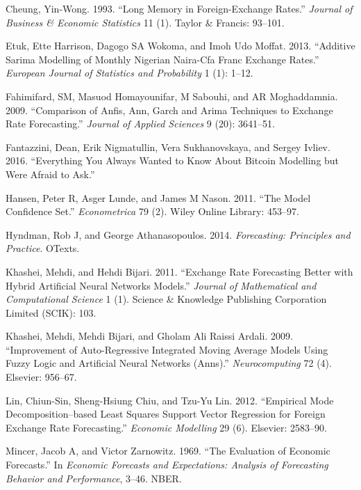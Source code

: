 \documentclass[12pt,a4paper]{article}
\numberwithin{equation}{section}
\numberwithin{figure}{section}
\numberwithin{table}{section}
\begin{document}
\hypertarget{ref-cheung1993}{}
Cheung, Yin-Wong. 1993. ``Long Memory in Foreign-Exchange Rates.''
\emph{Journal of Business \& Economic Statistics} 11 (1). Taylor \&
Francis: 93--101.

\hypertarget{ref-etuk2013}{}
Etuk, Ette Harrison, Dagogo SA Wokoma, and Imoh Udo Moffat. 2013.
``Additive Sarima Modelling of Monthly Nigerian Naira-Cfa Franc Exchange
Rates.'' \emph{European Journal of Statistics and Probability} 1 (1):
1--12.

\hypertarget{ref-fahimifard2009}{}
Fahimifard, SM, Masuod Homayounifar, M Sabouhi, and AR Moghaddamnia.
2009. ``Comparison of Anfis, Ann, Garch and Arima Techniques to Exchange
Rate Forecasting.'' \emph{Journal of Applied Sciences} 9 (20): 3641--51.

\hypertarget{ref-fantazzini2016}{}
Fantazzini, Dean, Erik Nigmatullin, Vera Sukhanovskaya, and Sergey
Ivliev. 2016. ``Everything You Always Wanted to Know About Bitcoin
Modelling but Were Afraid to Ask.''

\hypertarget{ref-hansen2011}{}
Hansen, Peter R, Asger Lunde, and James M Nason. 2011. ``The Model
Confidence Set.'' \emph{Econometrica} 79 (2). Wiley Online Library:
453--97.

\hypertarget{ref-hyndman2014}{}
Hyndman, Rob J, and George Athanasopoulos. 2014. \emph{Forecasting:
Principles and Practice}. OTexts.

\hypertarget{ref-khashei2011}{}
Khashei, Mehdi, and Hehdi Bijari. 2011. ``Exchange Rate Forecasting
Better with Hybrid Artificial Neural Networks Models.'' \emph{Journal of
Mathematical and Computational Science} 1 (1). Science \& Knowledge
Publishing Corporation Limited (SCIK): 103.

\hypertarget{ref-khashei2009}{}
Khashei, Mehdi, Mehdi Bijari, and Gholam Ali Raissi Ardali. 2009.
``Improvement of Auto-Regressive Integrated Moving Average Models Using
Fuzzy Logic and Artificial Neural Networks (Anns).''
\emph{Neurocomputing} 72 (4). Elsevier: 956--67.

\hypertarget{ref-lin2012}{}
Lin, Chiun-Sin, Sheng-Hsiung Chiu, and Tzu-Yu Lin. 2012. ``Empirical
Mode Decomposition--based Least Squares Support Vector Regression for
Foreign Exchange Rate Forecasting.'' \emph{Economic Modelling} 29 (6).
Elsevier: 2583--90.

\hypertarget{ref-mincer1969}{}
Mincer, Jacob A, and Victor Zarnowitz. 1969. ``The Evaluation of
Economic Forecasts.'' In \emph{Economic Forecasts and Expectations:
Analysis of Forecasting Behavior and Performance}, 3--46. NBER.
\end{document}
